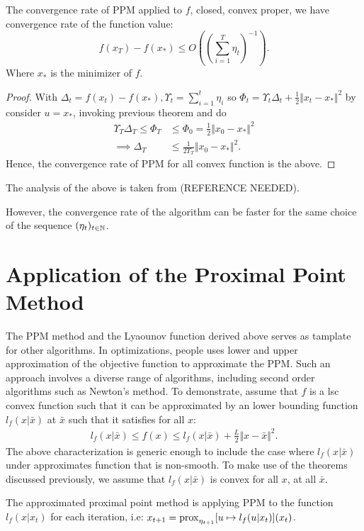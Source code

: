 \documentclass[12pt]{article}
\begin{document}
        \begin{theorem}
            The convergence rate of PPM applied to $f$, closed, convex proper, we have convergence rate of the function value: 
            $$
            f(x_T) - f(x_*) \le O\left(\left(\sum_{i=1}^{T}\eta_t\right)^{-1}\right). 
            $$
            Where $x_*$ is the minimizer of $f$. 
        \end{theorem}
        \begin{proof}
            With $\Delta_t = f(x_t) - f(x_*), \Upsilon_t = \sum_{i = 1}^{t}\eta_i$ so $\Phi_t = \Upsilon_t\Delta_t + \frac{1}{2}\Vert x_t - x_*\Vert^2$ by consider $u = x_*$, invoking previous theorem and do
            \begin{align*}
                \Upsilon_T\Delta_T \le \Phi_T 
                &\le 
                \Phi_0 = \frac{1}{2}\Vert x_0 - x_*\Vert^2 
                \\
                \implies \Delta_T 
                &\le 
                \frac{1}{2\Upsilon_T} \Vert x_0 - x_*\Vert^2. 
            \end{align*}
            Hence, the convergence rate of PPM for all convex function is the above. 
        \end{proof}
        \begin{remark}
            The analysis of the above is taken from (REFERENCE NEEDED). 
        \end{remark}
        However, the convergence rate of the algorithm can be faster for the same choice of the sequence $(\eta_t)_{t \in \mathbb N}$. 
        \begin{theorem}
            
            
        \end{theorem}
\section{Application of the Proximal Point Method}
    The PPM method and the Lyaounov function derived above serves as tamplate for other algorithms. 
    In optimizations, people uses lower and upper approximation of the objective function to approximate the PPM. 
    Such an approach involves a diverse range of algorithms, including second order algorithms such as Newton's method. 
    To demonstrate, assume that $f$ is a lsc convex function such that it can be approximated by an lower bounding function $l_f(x|\bar x)$ at $\bar x$ such that it satisfies for all $x$: 
    \begin{align}
        l_f(x| \bar x) 
        \le f(x) \le l_f(x|\bar x) + \frac{L}{2}\Vert x - \bar x\Vert^2. 
    \end{align}
    The above characterization is generic enough to include the case where $l_f(x|\bar x)$ under approximates function that is non-smooth. 
    To make use of the theorems discussed previously, we assume that $l_f(x|\bar x)$ is convex for all $x$, at all $\bar x$. 
    \par 
    The approximated proximal point method is applying PPM to the function $l_f(x|x_t)$ for each iteration, i.e: $x_{t +1} = \operatorname{prox}_{\eta_{t + 1}}[u\mapsto l_f(u | x_t)](x_t)$. 
    
\end{document}
